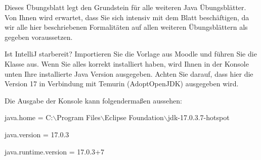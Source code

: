 \documentclass{../tuda-exercise}
\begin{document}
  \maketitle

  \begin{note}[title=Information:]
    Dieses Übungsblatt legt den Grundstein für alle weiteren Java Übungsblätter. Von Ihnen wird
    erwartet, dass Sie sich intensiv mit dem Blatt beschäftigen, da wir alle hier beschriebenen
    Formalitäten auf allen weiteren Übungsblättern als gegeben voraussetzen.
  \end{note}

  \begin{task}{Ist IntelliJ starbereit?}
    Importieren Sie die Vorlage  aus Moodle und führen Sie die Klasse
     aus. Wenn Sie alles korrekt installiert haben, wird Ihnen in
    der Konsole unten Ihre installierte Java Version ausgegeben. Achten Sie darauf, dass hier
    die Version 17 in Verbindung mit Temurin (AdoptOpenJDK) ausgegeben wird.

    Die Ausgabe der Konsole kann folgendermaßen aussehen:

    \begin{note}[color=tuda-gray]
      java.home = C:\(\backslash\)Program Files\(\backslash\)Eclipse Foundation\(\backslash\)jdk-17.0.3.7-hotspot

      java.version = 17.0.3

      java.runtime.version = 17.0.3+7
    \end{note}
  \end{task}

  \clearpage
\end{document}
